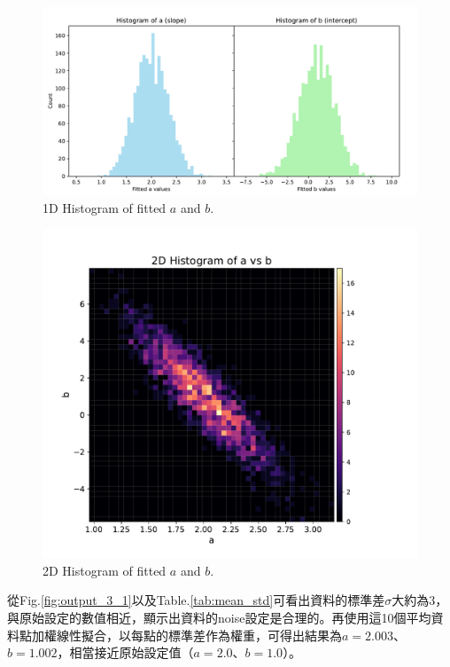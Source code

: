 \documentclass[12pt,a4paper]{article}
\begin{document}
\begin{CJK}{UTF8}{bkai}
\begin{figure}[h]
    \centering
    \includegraphics[width=1\linewidth]{figures/output/practice_3/output3_2.pdf}
    \caption{1D Histogram of fitted $a$ and $b$.}
    \label{fig:output_3_2}
\end{figure}

\begin{figure}[h]
    \centering
    \hspace{1cm}\includegraphics[width=.8\linewidth]{figures/output/practice_3/output3_3.pdf}
    \caption{2D Histogram of fitted $a$ and $b$.}
    \label{fig:output_3_3}
\end{figure}

\clearpage

從Fig.\ref{fig:output_3_1}以及Table.\ref{tab:mean_std}可看出資料的標準差$\sigma$大約為3，與原始設定的數值相近，顯示出資料的noise設定是合理的。再使用這10個平均資料點加權線性擬合，以每點的標準差作為權重，可得出結果為$a=2.003$、$b=1.002$，相當接近原始設定值（$a=2.0$、$b=1.0$）。


\end{CJK}
\end{document}

